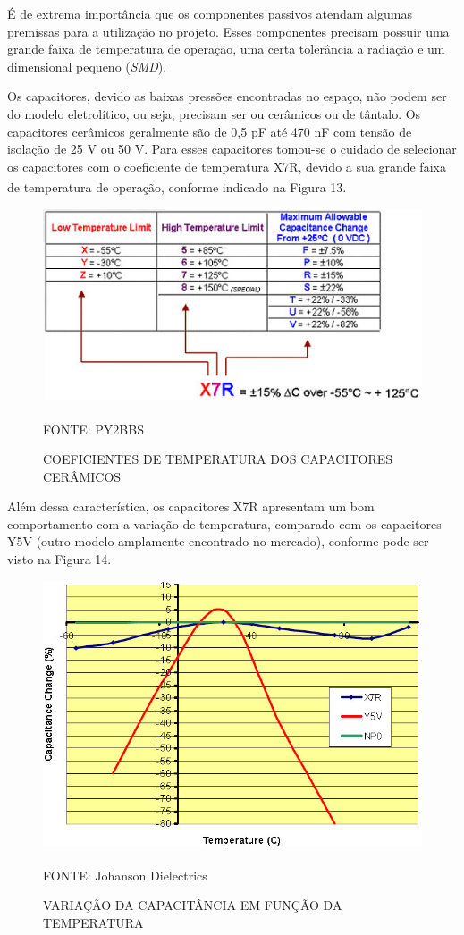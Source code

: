 \documentclass[
	12pt,				%
	openright,			%
	oneside,			%
	a4paper,			%
	english,			%
	french,				%
	spanish,			%
	brazil,				%
	oldfontcommands
	]{abntex2}
\begin{document}
	É de extrema importância que os componentes passivos atendam algumas premissas para a utilização no projeto. Esses componentes precisam possuir uma grande faixa de temperatura de operação, uma certa tolerância a radiação e um dimensional pequeno (\textit{SMD}).
	
	Os capacitores, devido as baixas pressões encontradas no espaço, não podem ser do modelo eletrolítico, ou seja, precisam ser ou cerâmicos ou de tântalo. Os capacitores cerâmicos geralmente são de 0,5 pF até 470 nF com tensão de isolação de 25 V ou 50 V. Para esses capacitores tomou-se o cuidado de selecionar os capacitores com o coeficiente de temperatura X7R, devido a sua grande faixa de temperatura de operação, conforme indicado na Figura 13.\textsuperscript{\cite{x7r}}
	
	\begin{figure}[th]
		\caption{COEFICIENTES DE TEMPERATURA DOS CAPACITORES CERÂMICOS}
		\centering
		\includegraphics[width=0.8\linewidth]{./figs/x7r}
			
		\begin{small}
			FONTE: PY2BBS\textsuperscript{\cite{x7r}}
		\end{small}		
	\end{figure}	
	\pagebreak
	Além dessa característica, os capacitores X7R apresentam um bom comportamento com a variação de temperatura, comparado com os capacitores Y5V (outro modelo amplamente encontrado no mercado), conforme pode ser visto na Figura 14.
	
	\begin{figure}[th]
		\caption{VARIAÇÃO DA CAPACITÂNCIA EM FUNÇÃO DA TEMPERATURA}
		\centering
		\includegraphics[width=0.8\linewidth]{./figs/y5v}
			
		\begin{small}
			FONTE: Johanson Dielectrics\textsuperscript{\cite{y5v}}
		\end{small}		
	\end{figure}
	
\end{document}
